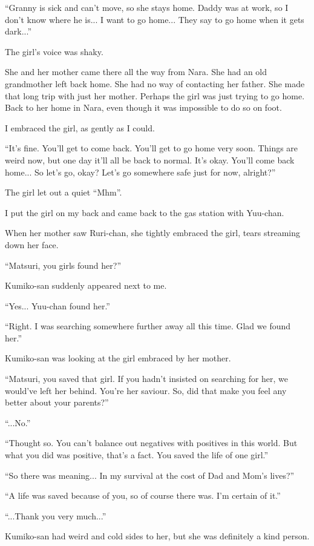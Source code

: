 ``Granny is sick and can't move, so she stays home. Daddy was at work, so I don't know where he is... I want to go home... They say to go home when it gets dark...''

The girl's voice was shaky.

She and her mother came there all the way from Nara. She had an old grandmother left back home. She had no way of contacting her father. She made that long trip with just her mother. Perhaps the girl was just trying to go home. Back to her home in Nara, even though it was impossible to do so on foot.

I embraced the girl, as gently as I could.

``It's fine. You'll get to come back. You'll get to go home very soon. Things are weird now, but one day it'll all be back to normal. It's okay. You'll come back home... So let's go, okay? Let's go somewhere safe just for now, alright?''

The girl let out a quiet ``Mhm''.

I put the girl on my back and came back to the gas station with Yuu-chan.

When her mother saw Ruri-chan, she tightly embraced the girl, tears streaming down her face.

``Matsuri, you girls found her?''

Kumiko-san suddenly appeared next to me.

``Yes... Yuu-chan found her.''

``Right. I was searching somewhere further away all this time. Glad we found her.''

Kumiko-san was looking at the girl embraced by her mother.

``Matsuri, you saved that girl. If you hadn't insisted on searching for her, we would've left her behind. You're her saviour. So, did that make you feel any better about your parents?''

``...No.''

``Thought so. You can't balance out negatives with positives in this world. But what you did was positive, that's a fact. You saved the life of one girl.''

``So there was meaning... In my survival at the cost of Dad and Mom's lives?''

``A life was saved because of you, so of course there was. I'm certain of it.''

``...Thank you very much...''

Kumiko-san had weird and cold sides to her, but she was definitely a kind person.

